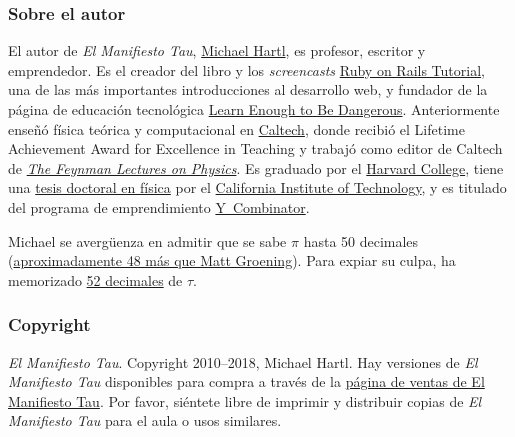 
    \subsubsection{Sobre el autor} %
    \label{sec:about_the_author}


El autor de \emph{El Manifiesto Tau}, \href{http://www.michaelhartl.com/}{Michael Hartl}, es profesor, escritor y emprendedor. Es el creador del libro y los \textit{screencasts}
\href{http://www.railstutorial.org/}{Ruby on Rails Tutorial}, una de las más importantes introducciones al desarrollo web, y fundador de la página de educación tecnológica \href{http://learnenough.com/}{Learn Enough to Be Dangerous}. Anteriormente enseñó física teórica y computacional en \href{http://www.caltech.edu/}{Caltech}, donde recibió el Lifetime Achievement Award for Excellence in Teaching y trabajó como editor de Caltech de \href{http://www.feynmanlectures.caltech.edu/}{\emph{The Feynman Lectures on Physics}}. Es graduado por el \href{http://college.harvard.edu/}{Harvard College}, tiene una \href{http://thesis.library.caltech.edu/1940/}{tesis doctoral en física} por el \href{http://www.caltech.edu/}{California Institute of Technology}, y es titulado del programa de emprendimiento \href{http://ycombinator.com/}{Y~Combinator}.

Michael se avergüenza en admitir que se sabe $\pi$ hasta 50 decimales (\href{\#fig-futurama_video}{aproximadamente 48 más que Matt Groening}). Para expiar su culpa, ha memorizado \href{http://www.wolframalpha.com/input/?i=N[2+Pi,+53]}{52 decimales} de $\tau$.

    \subsubsection{Copyright} %
    \label{sec:copyright_and_license}

    \emph{El Manifiesto Tau}. Copyright 2010--2018, Michael Hartl. Hay versiones de \emph{El Manifiesto Tau} disponibles para compra a través de la \href{http://sales.tauday.com/}{página de ventas de El Manifiesto Tau}. Por favor, siéntete libre de imprimir y distribuir copias de \emph{El Manifiesto Tau} para el aula o usos similares.

